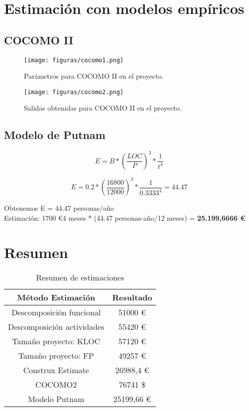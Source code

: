 \section{Estimación con modelos empíricos}

\subsection{COCOMO II}

\begin{figure}[H]
	\centering
	\texttt{[image: figuras/cocomo1.png]}
	\caption{Parámetros para COCOMO II en el proyecto.} 
	\label{fig:cocomo1}
\end{figure}

\begin{figure}[H]
	\centering
	\texttt{[image: figuras/cocomo2.png]}
	\caption{Salidas obtenidas para COCOMO II en el proyecto.} 
	\label{fig:cocomo2}
\end{figure}

\subsection{Modelo de Putnam}

\begin{equation*}
E = B * \left( \frac{LOC}{P} \right)^3 * \frac{1}{t^4} 
\end{equation*}

\begin{equation*}
E = 0.2 * \left( \frac{16800}{12000} \right)^3 * \frac{1}{0.3333^4} = 44.47 
\end{equation*}

Obtenemos E = 44.47 personas/año\\

Estimación: 1700 \euro * 4 meses * (44.47 personas-año/12 meses) = \textbf{25.199,6666 \euro}


\section{Resumen}

\begin{table}[H]
	\begin{center}
		\begin{tabular}{|c||c|}
			\hline 
			Método Estimación & Resultado \\
			\hline \hline
			Descomposición funcional & 51000 \euro \\ \hline
			Descomposición actividades & 55420 \euro \\ \hline
			Tamaño proyecto: KLOC & 57120 \euro \\ \hline
			Tamaño proyecto: FP & 49257 \euro \\ \hline
			Construx Estimate & 26988,4 \euro \\ \hline
			COCOMO2 & 76741 \$ \\ \hline
			Modelo Putnam & 25199,66 \euro \\ \hline
		\end{tabular}
		\caption{Resumen de estimaciones}
		\label{tabla:resumen}
	\end{center}
\end{table}

